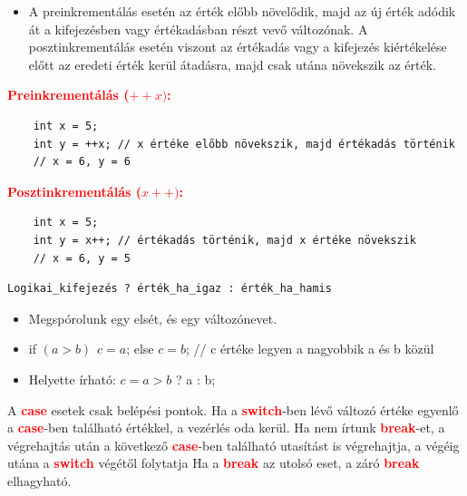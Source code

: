 \documentclass[12pt,a4paper]{article}
\begin{document}
            \begin{tcolorbox}[colback=blue!5!white,colframe=blue!50!black,title= 48. Ismertesse példával a pre-és posztinkrementálás közti különbséget!]
                \begin{itemize}
                    \item A preinkrementálás esetén az érték előbb növelődik, majd az új érték adódik át a kifejezésben vagy értékadásban részt vevő változónak. A posztinkrementálás esetén viszont az értékadás vagy a kifejezés kiértékelése előtt az eredeti érték kerül átadásra, majd csak utána növekszik az érték.
                \end{itemize}
                \textcolor{red}{\textbf{Preinkrementálás (\(++x)\):}}
                \begin{Verbatim}
    int x = 5;
    int y = ++x; // x értéke előbb növekszik, majd értékadás történik
    // x = 6, y = 6
                \end{Verbatim}
                \textcolor{red}{\textbf{Posztinkrementálás (\(x++)\):}}
                \begin{Verbatim}
    int x = 5;
    int y = x++; // értékadás történik, majd x értéke növekszik 
    // x = 6, y = 5
                \end{Verbatim}
            \end{tcolorbox}

            \begin{tcolorbox}[colback=blue!5!white,colframe=blue!50!black,title= 49.  Ismertesse a C nyelv háromoperandusú operátorát!]
            \begin{Verbatim}
Logikai_kifejezés ? érték_ha_igaz : érték_ha_hamis
            \end{Verbatim}
                \begin{itemize}
                    \item Megspórolunk egy elsét, és egy változónevet.
                    \item if \((a>b)\hspace{5pt} c=a\); else \(c=b\); // c értéke legyen a nagyobbik a és b közül
                    \item Helyette írható: \(c = a>b\) ? a : b;
                \end{itemize}
            \end{tcolorbox}

            \begin{tcolorbox}[colback=blue!5!white,colframe=blue!50!black,title= 50. Ismertesse a „break” utasítás szerepét a „switch” utasításban!]
                A \textcolor{red}{\textbf{case}} esetek csak belépési pontok. Ha a \textcolor{red}{\textbf{switch}}-ben lévő változó értéke egyenlő a \textcolor{red}{\textbf{case}}-ben található értékkel, a vezérlés oda kerül. Ha nem írtunk \textcolor{red}{\textbf{break}}-et, a végrehajtás után a következő \textcolor{red}{\textbf{case}}-ben található utasítást is végrehajtja, a végéig  utána a \textcolor{red}{\textbf{switch}} végétől folytatja Ha a \textcolor{red}{\textbf{break}} az utolsó eset, a záró \textcolor{red}{\textbf{break}} elhagyható.
            \end{tcolorbox}
\end{document}
